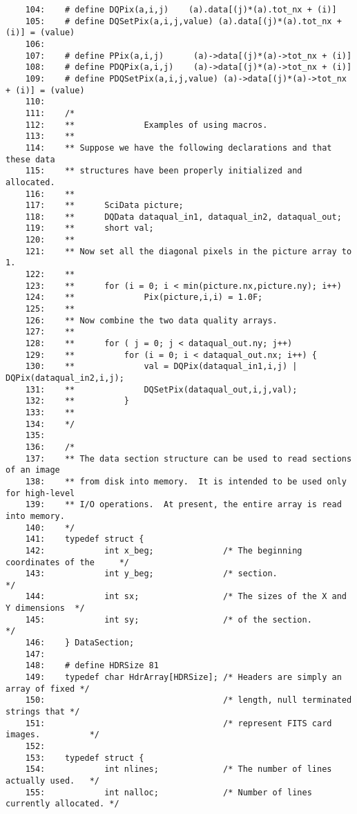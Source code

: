 \begin{scriptsize}
\begin{verbatim}
    104:    # define DQPix(a,i,j)    (a).data[(j)*(a).tot_nx + (i)]
    105:    # define DQSetPix(a,i,j,value) (a).data[(j)*(a).tot_nx + (i)] = (value)
    106:    
    107:    # define PPix(a,i,j)      (a)->data[(j)*(a)->tot_nx + (i)]
    108:    # define PDQPix(a,i,j)    (a)->data[(j)*(a)->tot_nx + (i)]
    109:    # define PDQSetPix(a,i,j,value) (a)->data[(j)*(a)->tot_nx + (i)] = (value)
    110:    
    111:    /*
    112:    **              Examples of using macros.  
    113:    **
    114:    ** Suppose we have the following declarations and that these data 
    115:    ** structures have been properly initialized and allocated.
    116:    **
    117:    **      SciData picture;
    118:    **      DQData dataqual_in1, dataqual_in2, dataqual_out;
    119:    **      short val;
    120:    **
    121:    ** Now set all the diagonal pixels in the picture array to 1.
    122:    **
    123:    **      for (i = 0; i < min(picture.nx,picture.ny); i++) 
    124:    **              Pix(picture,i,i) = 1.0F;
    125:    **
    126:    ** Now combine the two data quality arrays.
    127:    **
    128:    **      for ( j = 0; j < dataqual_out.ny; j++)
    129:    **          for (i = 0; i < dataqual_out.nx; i++) {
    130:    **              val = DQPix(dataqual_in1,i,j) | DQPix(dataqual_in2,i,j);
    131:    **              DQSetPix(dataqual_out,i,j,val);
    132:    **          }
    133:    **
    134:    */
    135:    
    136:    /*
    137:    ** The data section structure can be used to read sections of an image
    138:    ** from disk into memory.  It is intended to be used only for high-level
    139:    ** I/O operations.  At present, the entire array is read into memory.
    140:    */
    141:    typedef struct {
    142:            int x_beg;              /* The beginning coordinates of the     */
    143:            int y_beg;              /* section.                             */
    144:            int sx;                 /* The sizes of the X and Y dimensions  */
    145:            int sy;                 /* of the section.                      */
    146:    } DataSection;
    147:    
    148:    # define HDRSize 81
    149:    typedef char HdrArray[HDRSize]; /* Headers are simply an array of fixed */
    150:                                    /* length, null terminated strings that */
    151:                                    /* represent FITS card images.          */
    152:    
    153:    typedef struct {
    154:            int nlines;             /* The number of lines actually used.   */
    155:            int nalloc;             /* Number of lines currently allocated. */

\end{verbatim}
\end{scriptsize}
